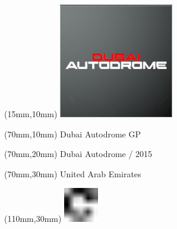 \null\newpage
\begin{textblock*}{50mm}(15mm,10mm)%
\includegraphics[width=50mm]{LG/2015-05-20_00081.png}
\end{textblock*}
\begin{textblock*}{130mm}(70mm,10mm)%
{\fontsize{20}{20}\selectfont Dubai Autodrome GP}\\
\end{textblock*}
\begin{textblock*}{120mm}(70mm,20mm)%
{\fontsize{16}{16}\selectfont Dubai Autodrome / 2015}\\
\end{textblock*}
\begin{textblock*}{120mm}(70mm,30mm)%
{\fontsize{12}{12}\selectfont United Arab Emirates}
\end{textblock*}
\begin{textblock*}{30mm}(110mm,30mm)%
\centering
\includegraphics[height=15mm]{icons/fa-rotate-right.pdf}
\end{textblock*}
